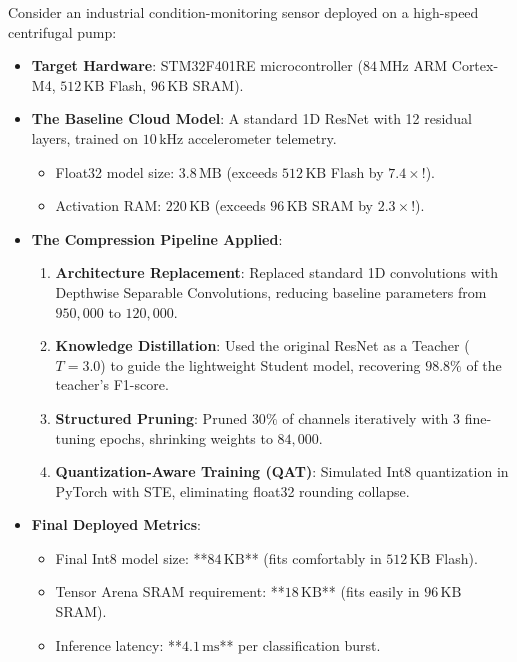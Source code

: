 \begin{iotbox}
Consider an industrial condition-monitoring sensor deployed on a high-speed centrifugal pump:
\begin{itemize}
    \item \textbf{Target Hardware}: STM32F401RE microcontroller ($84\,\text{MHz}$ ARM Cortex-M4, $512\,\text{KB}$ Flash, $96\,\text{KB}$ SRAM).
    \item \textbf{The Baseline Cloud Model}: A standard 1D ResNet with 12 residual layers, trained on $10\,\text{kHz}$ accelerometer telemetry.
    \begin{itemize}
        \item Float32 model size: $3.8\,\text{MB}$ (exceeds $512\,\text{KB}$ Flash by $7.4\times$!).
        \item Activation RAM: $220\,\text{KB}$ (exceeds $96\,\text{KB}$ SRAM by $2.3\times$!).
    \end{itemize}
    \item \textbf{The Compression Pipeline Applied}:
    \begin{enumerate}
        \item \textbf{Architecture Replacement}: Replaced standard 1D convolutions with Depthwise Separable Convolutions, reducing baseline parameters from $950{,}000$ to $120{,}000$.
        \item \textbf{Knowledge Distillation}: Used the original ResNet as a Teacher ($T = 3.0$) to guide the lightweight Student model, recovering $98.8\%$ of the teacher's F1-score.
        \item \textbf{Structured Pruning}: Pruned $30\%$ of channels iteratively with 3 fine-tuning epochs, shrinking weights to $84{,}000$.
        \item \textbf{Quantization-Aware Training (QAT)}: Simulated Int8 quantization in PyTorch with STE, eliminating float32 rounding collapse.
    \end{enumerate}
    \item \textbf{Final Deployed Metrics}:
    \begin{itemize}
        \item Final Int8 model size: **$84\,\text{KB}$** (fits comfortably in $512\,\text{KB}$ Flash).
        \item Tensor Arena SRAM requirement: **$18\,\text{KB}$** (fits easily in $96\,\text{KB}$ SRAM).
        \item Inference latency: **$4.1\,\text{ms}$** per classification burst.
    \end{itemize}
\end{itemize}
\end{iotbox}


